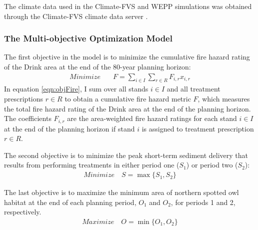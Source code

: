The climate data used in the Climate-FVS and WEPP simulations was obtained through the Climate-FVS climate data server \cite{climateFVSReadyData}.

\subsubsection{The Multi-objective Optimization Model}
The first objective in the model is to minimize the cumulative fire hazard rating of the Drink area at the end of the 80-year planning horizon:
\begin{align}
Minimize \quad & F = \sum_{i\in I} \sum_{r\in R} F_{i,r} x_{i,r} \label{eqn:objFire}
\end{align}
In equation \eqref{eqn:objFire}, I sum over all stands $i \in I$ and all treatment prescriptions $r \in R$ to obtain a cumulative fire hazard metric $F$, which measures the total fire hazard rating of the Drink area at the end of the planning horizon. The coefficients $F_{i,r}$ are the area-weighted fire hazard ratings for each stand $i \in I$ at the end of the planning horizon if stand $i$ is assigned to treatment prescription $r \in R$.

The second objective is to minimize the peak short-term sediment delivery that results from performing treatments in either period one ($S_1$) or period two ($S_2$):
\begin{align}
Minimize \quad S = \max \{S_1,S_2\} \label{eqn:objSediment}
\end{align}

The last objective is to maximize the minimum area of northern spotted owl habitat at the end of each planning period, $O_1$ and $O_2$, for periods 1 and 2, respectively.
\begin{align}
Maximize \quad O = \min \{O_1,O_2\} \label{eqn:objOwl}
\end{align}

